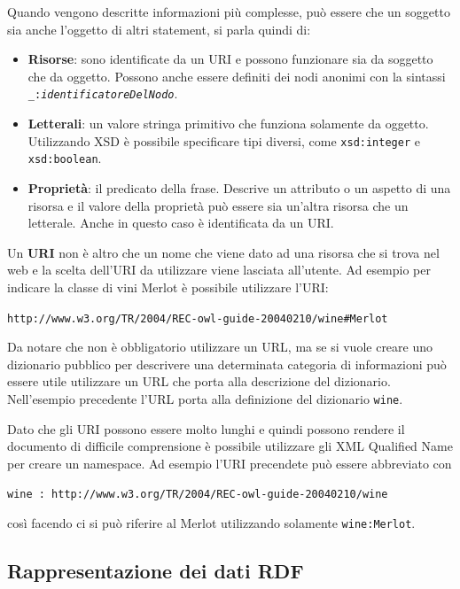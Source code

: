 Quando vengono descritte informazioni più complesse, può essere che un soggetto sia anche l'oggetto di altri statement, si parla quindi di:

\begin{itemize}
	\item \textbf{Risorse}: sono identificate da un URI e possono funzionare sia da soggetto che da oggetto. Possono anche essere definiti dei nodi anonimi con la sintassi \texttt{\_:\textit{identificatoreDelNodo}}.
	\item \textbf{Letterali}: un valore stringa primitivo che funziona solamente da oggetto. Utilizzando XSD è possibile specificare tipi diversi, come \texttt{xsd:integer} e \texttt{xsd:boolean}.
	\item \textbf{Proprietà}: il predicato della frase. Descrive un attributo o un aspetto di una risorsa e il valore della proprietà può essere sia un'altra risorsa che un letterale. Anche in questo caso è identificata da un URI. 
\end{itemize}

Un \textbf{URI} non è altro che un nome che viene dato ad una risorsa che si trova nel web e la scelta dell'URI da utilizzare viene lasciata all'utente.
Ad esempio per indicare la classe di vini Merlot è possibile utilizzare l'URI:

\begin{center}
	\texttt{http://www.w3.org/TR/2004/REC-owl-guide-20040210/wine\#Merlot}
\end{center}

Da notare che non è obbligatorio utilizzare un URL, ma se si vuole creare uno dizionario pubblico per descrivere una determinata categoria di informazioni può essere utile utilizzare un URL che porta alla descrizione del dizionario. Nell'esempio precedente l'URL porta alla definizione del dizionario \texttt{wine}.

Dato che gli URI possono essere molto lunghi e quindi possono rendere il documento di difficile comprensione è possibile utilizzare gli XML Qualified Name per creare un namespace.
Ad esempio l'URI precendete può essere abbreviato con 

\begin{center}
	\texttt{wine : http://www.w3.org/TR/2004/REC-owl-guide-20040210/wine}
\end{center}

\noindent così facendo ci si può riferire al Merlot utilizzando solamente \texttt{wine:Merlot}.

\subsection{Rappresentazione dei dati RDF}

